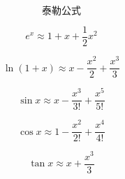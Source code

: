 \[
	\text{泰勒公式}
\]

\[
	e^x \approx 1+x+\frac{1}{2}x^2
\]

\[
	\ln(1+x) \approx x-\frac{x^2}{2}+\frac{x^3}{3}
\]

\[
	\sin x \approx x-\frac{x^3}{3!}+\frac{x^5}{5!}
\]

\[
	\cos x \approx 1-\frac{x^2}{2!}+\frac{x^4}{4!}
\]

\[
	\tan x \approx x+\frac{x^3}{3}
\]